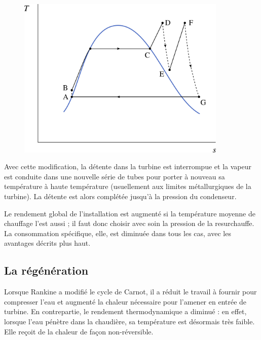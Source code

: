 		\begin{figure}
			\begin{center}
				\includegraphics[width=10cm]{images/ts_lv_rankine_surchauffe_resurchauffe.png}
			\end{center}
			\label{fig_ts_lv_surchauffe_resurchauffe}
		\end{figure}

		Avec cette modification, la détente dans la turbine est interrompue et la vapeur est conduite dans une nouvelle série de tubes pour porter à nouveau sa température à haute température (usuellement aux limites métallurgiques de la turbine). La détente est alors complétée jusqu’à la pression du condenseur.

		Le rendement global de l’installation est augmenté si la température moyenne de chauffage l’est aussi ; il faut donc choisir avec soin la pression de la resurchauffe. La consommation spécifique, elle, est diminuée dans tous les cas, avec les avantages décrits plus haut.



	\subsection{La régénération}
	\label{ch_regeneration}

		Lorsque Rankine a modifié le cycle de Carnot, il a réduit le travail à fournir pour compresser l’eau et augmenté la chaleur nécessaire pour l’amener en entrée de turbine. En contrepartie, le rendement thermodynamique a diminué : en effet, lorsque l’eau pénètre dans la chaudière, sa température est désormais très faible. Elle reçoit de la chaleur de façon non-réversible.

